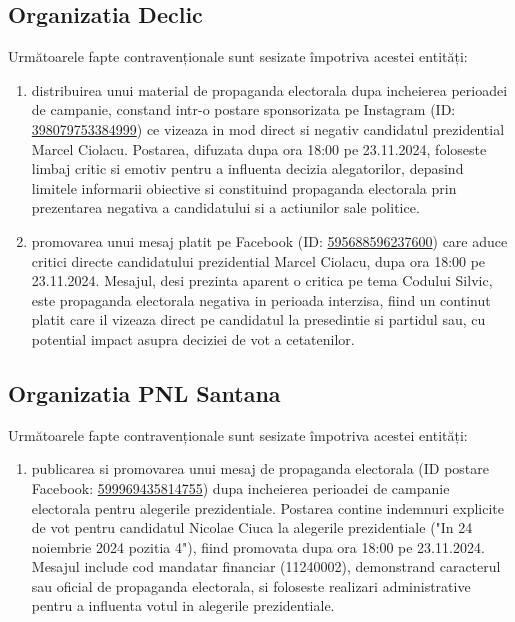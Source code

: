 \documentclass[a4paper,12pt]{article}
\begin{document}
\vspace{0.5cm}

\subsection{Organizatia Declic}
Următoarele fapte contravenționale sunt sesizate împotriva acestei entități:

\begin{enumerate}[leftmargin=*, label=\arabic*.)]
    \item distribuirea unui material de propaganda electorala dupa incheierea perioadei de campanie, constand intr-o postare sponsorizata pe Instagram (ID: \href{https://www.facebook.com/ads/library/?id=398079753384999}{398079753384999}) ce vizeaza in mod direct si negativ candidatul prezidential Marcel Ciolacu. Postarea, difuzata dupa ora 18:00 pe 23.11.2024, foloseste limbaj critic si emotiv pentru a influenta decizia alegatorilor, depasind limitele informarii obiective si constituind propaganda electorala prin prezentarea negativa a candidatului si a actiunilor sale politice.
    \item promovarea unui mesaj platit pe Facebook (ID: \href{https://www.facebook.com/ads/library/?id=595688596237600}{595688596237600}) care aduce critici directe candidatului prezidential Marcel Ciolacu, dupa ora 18:00 pe 23.11.2024. Mesajul, desi prezinta aparent o critica pe tema Codului Silvic, este propaganda electorala negativa in perioada interzisa, fiind un continut platit care il vizeaza direct pe candidatul la presedintie si partidul sau, cu potential impact asupra deciziei de vot a cetatenilor.
\end{enumerate}

\vspace{0.5cm}

\subsection{Organizatia PNL Santana}
Următoarele fapte contravenționale sunt sesizate împotriva acestei entități:

\begin{enumerate}[leftmargin=*, label=\arabic*.)]
    \item publicarea si promovarea unui mesaj de propaganda electorala (ID postare Facebook: \href{https://www.facebook.com/ads/library/?id=599969435814755}{599969435814755}) dupa incheierea perioadei de campanie electorala pentru alegerile prezidentiale. Postarea contine indemnuri explicite de vot pentru candidatul Nicolae Ciuca la alegerile prezidentiale ("In 24 noiembrie 2024 pozitia 4"), fiind promovata dupa ora 18:00 pe 23.11.2024. Mesajul include cod mandatar financiar (11240002), demonstrand caracterul sau oficial de propaganda electorala, si foloseste realizari administrative pentru a influenta votul in alegerile prezidentiale.
\end{enumerate}
\end{document}
